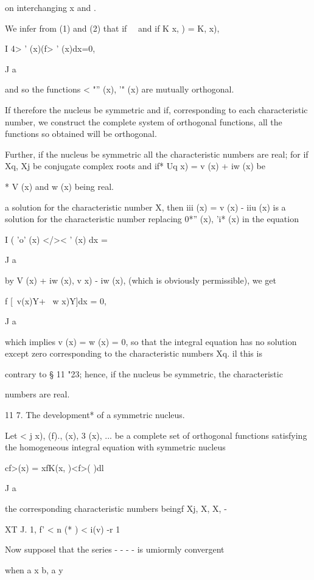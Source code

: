 {on interchanging x and .

We infer from (1) and (2) that if \ \ and if K x, ) = K, x),

I 4> ' (x)(f> ' (x)dx=0,

J a

and so the functions < "'' (x), '" (x) are mutually orthogonal.

If therefore the nucleus be symmetric and if, corresponding to each
characteristic number, we construct the complete system of orthogonal
functions, all the functions so obtained will be orthogonal.

Further, if the nucleus be symmetric all the characteristic numbers
are real; for if Xq, Xj be conjugate complex roots and if* Uq x) = v
(x) + iw (x) be

* V (x) and w (x) being real.

%
%

a solution for the characteristic number X, then iii (x) = v (x) -
iiu (x) is a solution for the characteristic number \; replacing 0*''
(x), 'i* (x) in the equation

I ( 'o' (x) </>< ' (x) dx =

J a

by V (x) + iw (x), v x) - iw (x), (which is obviously permissible), we
get

f [\ v(x)Y+ \ w x)Y]dx = 0,

J a

which implies v (x) = w (x) = 0, so that the integral equation has no
solution except zero corresponding to the characteristic numbers Xq.
il this is

contrary to § 11 "23; hence, if the nucleus be symmetric, the
characteristic

numbers are real.

11 7. The development* of a symmetric nucleus.

Let < j x), (f)., (x), 3 (x), ... be a complete set of orthogonal
functions satisfying the homogeneous integral equation with symmetric
nucleus

cf>(x) = xfK(x, )<f>( )dl

J a

the corresponding characteristic numbers beingf Xj, X, X, -

XT J. 1, f' < n (* ) < i(v)  -r 1

Now supposel that the series - - - - is umiormly convergent

when a x b, a y %

}
